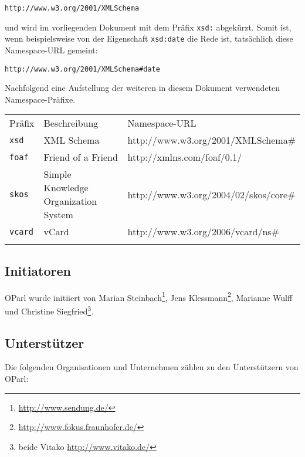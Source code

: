 \documentclass[,a4paper]{article}
\begin{document}
\begin{verbatim}
http://www.w3.org/2001/XMLSchema
\end{verbatim}

und wird im vorliegenden Dokument mit dem Präfix \texttt{xsd:}
abgekürzt. Somit ist, wenn beispielsweise von der Eigenschaft
\texttt{xsd:date} die Rede ist, tatsächlich diese Namespace-URL gemeint:

\begin{verbatim}
http://www.w3.org/2001/XMLSchema#date
\end{verbatim}

Nachfolgend eine Aufstellung der weiteren in diesem Dokument verwendeten
Namespace-Präfixe.

\begin{longtable}[c]{@{}lll@{}}
\toprule\addlinespace
Präfix & Beschreibung & Namespace-URL
\\\addlinespace
\midrule\endhead
\texttt{xsd} & XML Schema & http://www.w3.org/2001/XMLSchema\#
\\\addlinespace
\texttt{foaf} & Friend of a Friend & http://xmlns.com/foaf/0.1/
\\\addlinespace
\texttt{skos} & Simple Knowledge Organization System &
http://www.w3.org/2004/02/skos/core\#
\\\addlinespace
\texttt{vcard} & vCard & http://www.w3.org/2006/vcard/ns\#
\\\addlinespace
\bottomrule
\end{longtable}

\subsection{Initiatoren}\label{initiatoren}

OParl wurde initiiert von Marian Steinbach\footnote{\url{http://www.sendung.de/}},
Jens Klessmann\footnote{\url{http://www.fokus.fraunhofer.de/}}, Marianne
Wulff und Christine Siegfried\footnote{beide Vitako
  \url{http://www.vitako.de/}}.

\subsection{Unterstützer}\label{unterstuxfctzer}

Die folgenden Organisationen und Unternehmen zählen zu den Unterstützern
von OParl:
\end{document}
